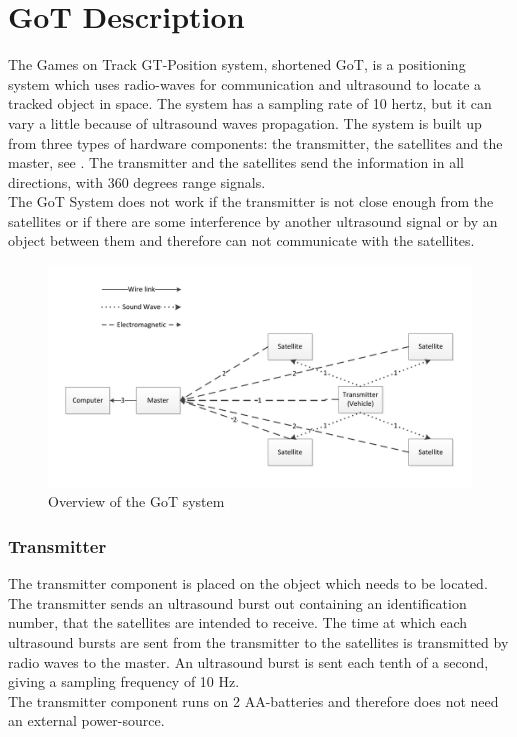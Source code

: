 \section{GoT Description}
\label{GoTDescription}
The Games on Track GT-Position system, shortened GoT, is a positioning system which uses radio-waves for communication and ultrasound to locate a tracked object in space. The system has a sampling rate of 10 hertz, but it can vary a little because of ultrasound waves propagation. The system is built up from three types of hardware components: the transmitter, the satellites and the master, see . The transmitter and the satellites send the information in all directions, with 360 degrees range signals.\\
The GoT System does not work if the transmitter is not close enough from the satellites or if there are some interference by another ultrasound signal or by an object between them and therefore can not communicate with the satellites.

\begin{figure}[H]
	\centering
	\includegraphics[scale=0.6]{figures/GoT_description.pdf}
	\caption{Overview of the GoT system}
	\label{GoTSystem}
\end{figure}

\subsubsection{Transmitter}
The transmitter component is placed on the object which needs to be located. The transmitter sends an ultrasound burst out containing an identification number, that the satellites are intended to receive. The time at which each ultrasound bursts are sent from the transmitter to the satellites is transmitted by radio waves to the master. An ultrasound burst is sent each tenth of a second, giving a sampling frequency of 10 Hz.\\ 
The transmitter component runs on 2 AA-batteries and therefore does not need an external power-source.

